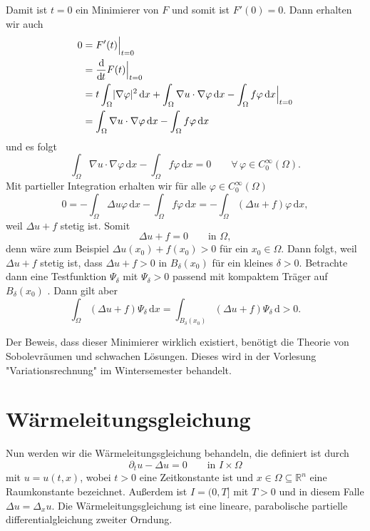 \begin{beweis}
\begin{description}
\[		\]
		Damit ist $t = 0$ ein Minimierer von $F$ und somit ist $F'(0)=0$. Dann erhalten wir auch
		\begin{align*}
			0 &= F'(t)  \Big|_{t=0}^{} \\ &= \frac{\mathrm{d}\mkern-1.0mu }{\mathrm{d}\mkern-1.0mu t} F(t)  \Big|_{t=0}^{} \\ &= t \int_{\Omega}^{} \lvert \nabla \varphi\rvert^2 \,\mathrm{d}x
			+ \int_{\Omega}^{}  \nabla u \cdot  \nabla \varphi \,\mathrm{d}x - \int_{\Omega}^{} f \varphi \,\mathrm{d}x  \Big|_{t=0}^{} \\
			&= \int_{\Omega}^{}  \nabla u \cdot  \nabla \varphi \,\mathrm{d}x - \int_{\Omega}^{}f \varphi \,\mathrm{d}x
		\end{align*}
	und es folgt
	\[
		\int_{\Omega}^{}  \nabla u \cdot  \nabla \varphi \,\mathrm{d}x - \int_{\Omega}^{} f \varphi \,\mathrm{d}x = 0 \qquad \forall\, \varphi \in C^{\infty}_0(\Omega).
	\]
	Mit partieller Integration erhalten wir für alle $\varphi \in C^{\infty}_0(\Omega)$
	\[
		0 = - \int_{\Omega}^{}  \Delta u  \varphi\,\mathrm{d}x - \int_{\Omega}^{}f \varphi \,\mathrm{d}x = - \int_{\Omega}^{}(  \Delta u + f) \varphi \,\mathrm{d}x,
	\]
	 weil $ \Delta u + f$ stetig ist. Somit
	 \[
	 	\Delta u + f = 0 \qquad \text{in } \Omega,
	 \]
	 denn wäre zum Beispiel $ \Delta u (x_0) + f(x_0) > 0$ für ein $x_0 \in \Omega$. Dann folgt, weil $ \Delta u + f$ stetig ist, dass
	 $\Delta u + f > 0$ in $B_{\delta }(x_0)$ für ein kleines $\delta > 0$. 
	 Betrachte dann eine Testfunktion $\Psi_{\delta}$ mit $\Psi_{\delta } > 0$ passend mit kompaktem Träger auf $B_{\delta }(x_0)$ . 
	 Dann gilt aber
	 \[
	 	\int_{\Omega}^{}( \Delta u + f) \Psi_{\delta } \,\mathrm{d}x = \int_{B_{\delta }(x_0)}^{} ( \Delta u + f)\Psi_{\delta } \,\mathrm{d} > 0.
	 \]
	\end{description}
\end{beweis}

Der Beweis, dass dieser Minimierer wirklich existiert, benötigt die Theorie von Sobolevräumen und schwachen Lösungen. Dieses wird in der Vorlesung "Variationsrechnung" im Wintersemester behandelt. 

\section{Wärmeleitungsgleichung} 
\label{sec:warmeleitungsgleichung}
Nun werden wir die Wärmeleitungsgleichung behandeln, die definiert ist durch
\[
	\partial_t u - \Delta u  = 0 \qquad \text{in }I \times \Omega
\]
mit $u = u(t,x)$, wobei $t>0$ eine Zeitkonstante ist und $x \in \Omega \subseteq \mathbb{R}^n$ eine Raumkonstante bezeichnet. Außerdem ist $I = (0,T]$ mit $T>0$ und in diesem Falle $ \Delta u = \Delta_x u$. Die Wärmeleitungsgleichung ist eine lineare, parabolische partielle differentialgleichung zweiter Orndung.

